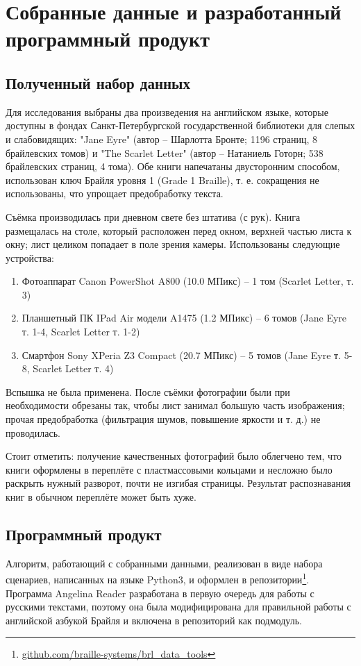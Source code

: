 \documentclass{main.tex}[subfiles]
\begin{document}
\newpage
\section{Собранные данные и разработанный программный продукт}
\subsection{Полученный набор данных}

Для исследования выбраны два произведения на английском языке, которые доступны в фондах Санкт-Петербургской государственной библиотеки для слепых и слабовидящих: "Jane Eyre"\hspace{0pt} (автор -- Шарлотта Бронте; 1196 страниц, 8 брайлевских томов) и "The Scarlet Letter"\hspace{0pt} (автор -- Натаниель Готорн; 538 брайлевских страниц, 4 тома).
Обе книги напечатаны двусторонним способом, использован ключ Брайля уровня 1 (Grade 1 Braille), т. е. сокращения не использованы, что упрощает предобработку текста.

Съёмка производилась при дневном свете без штатива (с рук).
Книга размещалась на столе, который расположен перед окном, верхней частью листа к окну; лист целиком попадает в поле зрения камеры.
Использованы следующие устройства:

\begin{enumerate}[noitemsep]
    \item Фотоаппарат Canon PowerShot A800 (10.0 МПикс) -- 1 том (Scarlet Letter, т. 3)
    \item Планшетный ПК IPad Air модели A1475 (1.2 МПикс) -- 6 томов (Jane Eyre т. 1-4, Scarlet Letter т. 1-2)
    \item Смартфон Sony XPeria Z3 Compact (20.7 МПикс) -- 5 томов (Jane Eyre т. 5-8, Scarlet Letter т. 4)
\end{enumerate}
Вспышка не была применена.
После съёмки фотографии были при необходимости обрезаны так, чтобы лист занимал большую часть изображения; прочая предобработка (фильтрация шумов, повышение яркости и т. д.) не проводилась.

Стоит отметить: получение качественных фотографий было облегчено тем, что книги оформлены в переплёте с пластмассовыми кольцами и несложно было раскрыть нужный разворот, почти не изгибая страницы.
Результат распознавания книг в обычном переплёте может быть хуже.

\subsection{Программный продукт}

Алгоритм, работающий с собранными данными, реализован в виде набора сценариев, написанных на языке Python3, и оформлен в репозитории\footnote{\href{https://github.com/braille-systems/brl_data_tools}{github.com/braille-systems/brl\_data\_tools}}.
Программа Angelina Reader разработана в первую очередь для работы с русскими текстами, поэтому она была модифицирована для правильной работы с английской азбукой Брайля и включена в репозиторий как подмодуль.
\end{document}
